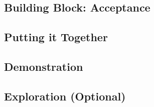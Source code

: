 \documentclass[]{article}
\begin{document}
\subsection{Building Block: Acceptance}

\subsection{Putting it Together}

\subsection{Demonstration}


\subsection{Exploration (Optional)}
\end{document}

